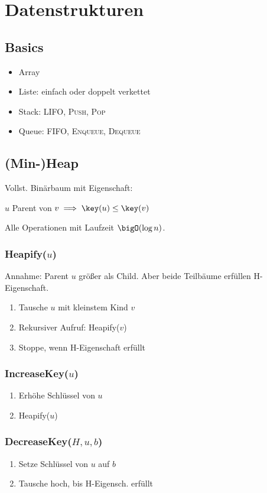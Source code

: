 \section*{Datenstrukturen}

\subsection*{Basics}
\begin{itemize}
	\item Array
	\item Liste: einfach oder doppelt verkettet
	\item Stack: LIFO, \textsc{Push}, \textsc{Pop}
	\item Queue: FIFO, \textsc{Enqueue}, \textsc{Dequeue}
\end{itemize}

\subsection*{(Min-)Heap}
Vollst. Binärbaum mit Eigenschaft:

$u$ Parent von $v \implies \key(u) \le \key(v)$

Alle Operationen mit Laufzeit $\bigO(\log n)$.

\subsubsection*{Heapify($u$)}
Annahme: Parent $u$ größer als Child.
Aber beide Teilbäume erfüllen H-Eigenschaft.
\begin{enumerate}
	\item Tausche $u$ mit kleinstem Kind $v$
	\item Rekursiver Aufruf: Heapify($v$)
	\item Stoppe, wenn H-Eigenschaft erfüllt
\end{enumerate}

\subsubsection*{IncreaseKey($u$)}
\begin{enumerate}
	\item Erhöhe Schlüssel von $u$
	\item Heapify($u$)
\end{enumerate}

\subsubsection*{DecreaseKey($H,u,b$)}
\begin{enumerate}
	\item Setze Schlüssel von $u$ auf $b$
	\item Tausche hoch, bis H-Eigensch. erfüllt
\end{enumerate}

